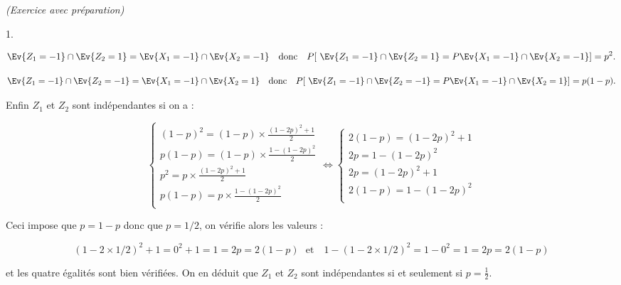 \documentclass[11pt]{article}%
\begin{document}
\begin{exercice}{\it (Exercice avec préparation)}
\begin{noliste}{1.}
 
\[
 \Ev{Z_{1} = -1 } \cap \Ev{Z_{2} = 1 } = \Ev{X_{1} = -1 } \cap
\Ev{X_{2} = -1 } \ \ \text{ donc } \ \ P [ \ \Ev{Z_{1} = -1 } \cap
\Ev{Z_{2} = 1 } = P \Ev{X_{1} = -1 } \cap \Ev{X_{2} = -1 } ] = p^{2}. 
\]

 
\[
 \Ev{Z_{1} = -1 } \cap \Ev{Z_{2} = -1 } = \Ev{X_{1} = -1 } \cap
\Ev{X_{2} = 1 } \ \ \text{ donc } \ \ P [ \ \Ev{Z_{1} = -1 } \cap
\Ev{Z_{2} = -1 } = P \Ev{X_{1} = -1 } \cap \Ev{X_{2} = 1 } ] = p (1-p).
\]

 Enfin $Z_{1}$ et $Z_{2}$ sont indépendantes si on a : 
 
\[
 \left\{\begin{array}{c}
 (1-p)^{2} = (1-p) \times \frac{ (1-2p)^{2} + 1 }{ 2 } \\
p (1-p) = (1-p) \times \frac{ 1 - (1-2p)^{2} }{ 2 } \\
p^{2} = p \times \frac{ (1-2p)^{2} + 1 }{ 2 } \\
p (1-p) = p \times \frac{ 1 - (1-2p)^{2} }{ 2 } \\
\end{array}
\right. \Longleftrightarrow \left\{\begin{array}{c}
 2 (1-p) = (1-2p)^{2} + 1 \\
2 p = 1 - (1-2p)^{2} \\
2p = (1-2p)^{2} + 1 \\
2 (1-p) = 1 - (1-2p)^{2} \\
\end{array}
\right. 
\]

 Ceci impose que $p = 1-p$ donc que $p = 1/2$, on vérifie alors les
valeurs : 
 
\[
 (1-2 \times 1/2 )^{2} + 1 = 0^{2} + 1 = 1 = 2 p = 2 (1-p) \ \ \ \text{
et } \ \ \ 1 - (1 - 2 \times 1/2)^{2} = 1 - 0^{2} = 1 = 2p = 2 (1-p) 
\]

 et les quatre égalités sont bien vérifiées. On en déduit que $Z_{1}$
et $Z_{2}$ sont indépendantes si et seulement si $p = \frac{1}{2}$.

 \end{noliste}
 \end{exercice}

 \newpage
\end{document}
